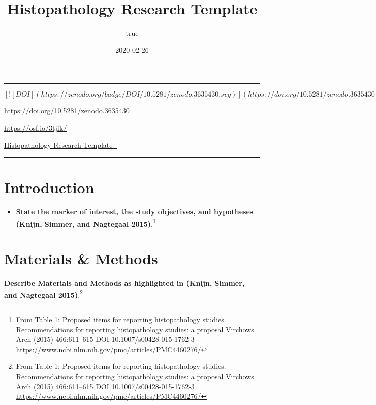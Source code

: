 \documentclass[
]{article}
\title{Histopathology Research Template}
\author{true}
\date{2020-02-26}
\providecommand{\tightlist}{%
  \setlength{\itemsep}{0pt}\setlength{\parskip}{0pt}}
\begin{document}
\maketitle

{
\setcounter{tocdepth}{5}
\tableofcontents
}
\begin{center}\rule{0.5\linewidth}{0.5pt}\end{center}

\([![DOI](https://zenodo.org/badge/DOI/10.5281/zenodo.3635430.svg)](https://doi.org/10.5281/zenodo.3635430)\)

\url{https://doi.org/10.5281/zenodo.3635430}

\url{https://osf.io/3tjfk/}

\href{https://sbalci.github.io/histopathology-template/}{Histopathology
Research Template 🔬}

\begin{center}\rule{0.5\linewidth}{0.5pt}\end{center}

\hypertarget{introduction}{%
\section{Introduction}\label{introduction}}

\begin{itemize}
\tightlist
\item
  \textbf{State the marker of interest, the study objectives, and
  hypotheses (Knijn, Simmer, and Nagtegaal 2015)}.\footnote{From Table
    1: Proposed items for reporting histopathology studies.
    Recommendations for reporting histopathology studies: a proposal
    Virchows Arch (2015) 466:611--615 DOI 10.1007/s00428-015-1762-3
    \url{https://www.ncbi.nlm.nih.gov/pmc/articles/PMC4460276/}}
\end{itemize}

\hypertarget{materials-methods}{%
\section{Materials \& Methods}\label{materials-methods}}

\textbf{Describe Materials and Methods as highlighted in (Knijn, Simmer,
and Nagtegaal 2015)}.\footnote{From Table 1: Proposed items for
  reporting histopathology studies. Recommendations for reporting
  histopathology studies: a proposal Virchows Arch (2015) 466:611--615
  DOI 10.1007/s00428-015-1762-3
  \url{https://www.ncbi.nlm.nih.gov/pmc/articles/PMC4460276/}}
\end{document}
